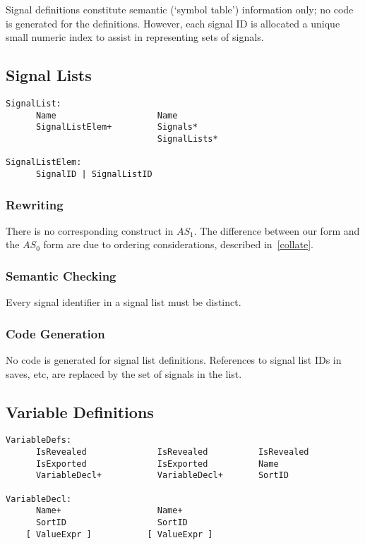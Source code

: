Signal definitions constitute semantic (`symbol table') information
only; no code is generated for the definitions.
However, each signal
ID is allocated a unique small numeric index to assist in
representing sets of signals.

\subsection{Signal Lists}

\begin{verbatim}
SignalList:
      Name                    Name
      SignalListElem+         Signals*
                              SignalLists*

SignalListElem:
      SignalID | SignalListID
\end{verbatim}

\subsubsection{Rewriting}

There is no corresponding construct in $AS_1$. The difference between
our form and the $AS_0$ form are due to ordering considerations,
described in~\ref{collate}.

\subsubsection{Semantic Checking}

Every signal identifier in a signal list must be distinct.

\subsubsection{Code Generation}

No code is generated for signal list definitions.
References to signal list IDs in saves, etc, are replaced by the 
set of signals in the list.

\subsection{Variable Definitions}

\begin{verbatim}
VariableDefs:
      IsRevealed              IsRevealed          IsRevealed
      IsExported              IsExported          Name
      VariableDecl+           VariableDecl+       SortID

VariableDecl:
      Name+                   Name+
      SortID                  SortID
    [ ValueExpr ]           [ ValueExpr ]
\end{verbatim}

